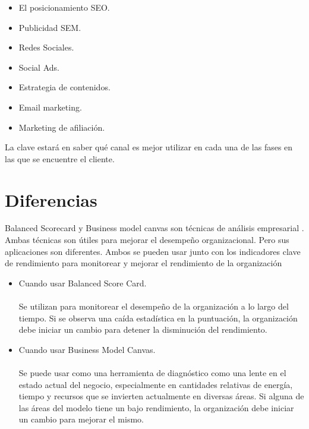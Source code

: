 \documentclass[preprint,12pt]{elsarticle}
\begin{document}
\begin{itemize}
\item El posicionamiento SEO.
\item Publicidad SEM.
\item Redes Sociales.
\item Social Ads.
\item Estrategia de contenidos.
\item Email marketing.
\item Marketing de afiliación.
\end{itemize}
La clave estará en saber qué canal es mejor utilizar en cada una de las fases en las que se encuentre el cliente.


	

	

\section{Diferencias}
Balanced Scorecard y Business model canvas son t\'ecnicas de análisis empresarial . Ambas t\'ecnicas son \'utiles para mejorar el desempeño organizacional. Pero sus aplicaciones son diferentes. Ambos se pueden usar junto con los indicadores clave de rendimiento para monitorear y mejorar el rendimiento de la organización
\begin{itemize}
\item Cuando usar Balanced Score Card.
   \\
    \\Se utilizan para monitorear el desempeño de la organización a lo largo del tiempo. Si se observa una caída estadística en la puntuación, la organización debe iniciar un cambio para detener la disminución del rendimiento. 
\item Cuando usar Business Model Canvas.
\\
      \\ Se puede usar como una herramienta de diagnóstico como una lente en el estado actual del negocio, especialmente en cantidades relativas de energía, tiempo y recursos que se invierten actualmente en diversas áreas. Si alguna de las áreas del modelo tiene un bajo rendimiento, la organización debe iniciar un cambio para mejorar el mismo.

\end{itemize}
	
	
\end{document}
